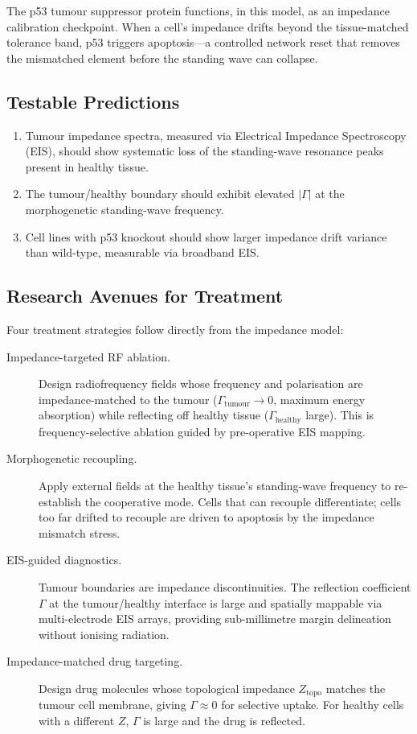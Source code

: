 The p53 tumour suppressor protein functions, in this model, as an
impedance calibration checkpoint.  When a cell's impedance drifts
beyond the tissue-matched tolerance band, p53 triggers apoptosis---a
controlled network reset that removes the mismatched element before
the standing wave can collapse.

\subsection{Testable Predictions}

\begin{enumerate}
  \item Tumour impedance spectra, measured via Electrical Impedance
        Spectroscopy (EIS), should show systematic loss of the
        standing-wave resonance peaks present in healthy tissue.
  \item The tumour/healthy boundary should exhibit elevated
        $|\Gamma|$ at the morphogenetic standing-wave frequency.
  \item Cell lines with p53 knockout should show larger impedance
        drift variance than wild-type, measurable via broadband EIS.
\end{enumerate}

\subsection{Research Avenues for Treatment}

Four treatment strategies follow directly from the impedance model:

\begin{description}
  \item[Impedance-targeted RF ablation.]
    Design radiofrequency fields whose frequency and polarisation
    are impedance-matched to the tumour ($\Gamma_{\mathrm{tumour}}
    \to 0$, maximum energy absorption) while reflecting off healthy
    tissue ($\Gamma_{\mathrm{healthy}}$ large).  This is
    frequency-selective ablation guided by pre-operative EIS mapping.

  \item[Morphogenetic recoupling.]
    Apply external fields at the healthy tissue's standing-wave
    frequency to re-establish the cooperative mode.  Cells that can
    recouple differentiate; cells too far drifted to recouple are
    driven to apoptosis by the impedance mismatch stress.

  \item[EIS-guided diagnostics.]
    Tumour boundaries are impedance discontinuities.  The reflection
    coefficient $\Gamma$ at the tumour/healthy interface is large
    and spatially mappable via multi-electrode EIS arrays, providing
    sub-millimetre margin delineation without ionising radiation.

  \item[Impedance-matched drug targeting.]
    Design drug molecules whose topological impedance
    $Z_{\mathrm{topo}}$ matches the tumour cell membrane, giving
    $\Gamma \approx 0$ for selective uptake.  For healthy cells with
    a different $Z$, $\Gamma$ is large and the drug is reflected.
\end{description}
